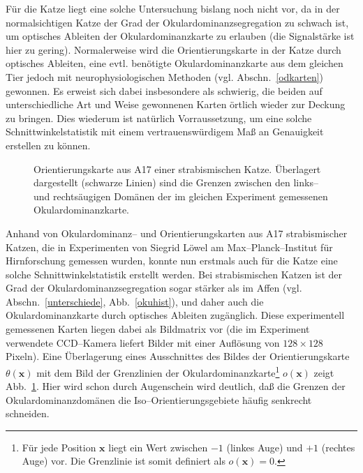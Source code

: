 Für die Katze liegt eine solche Untersuchung bislang noch nicht vor, da in
der normalsichtigen Katze der Grad der Okulardominanzsegregation zu schwach
ist, um optisches Ableiten der Okulardominanzkarte zu erlauben (die
Signalstärke ist hier zu gering). Normalerweise wird die
Orientierungskarte in der Katze durch optisches Ableiten, eine
evtl. benötigte Okulardominanzkarte aus dem gleichen Tier jedoch mit
neurophysiologischen Methoden (vgl. Abschn.~\ref{odkarten}) gewonnen. Es
erweist sich dabei insbesondere als schwierig, die beiden auf
unterschiedliche Art und Weise gewonnenen Karten örtlich wieder zur
Deckung zu bringen. Dies wiederum ist natürlich Vorraussetzung, um eine
solche Schnittwinkelstatistik mit einem vertrauenswürdigem Maß an
Genauigkeit erstellen zu können.

\begin{figure}[t]
\begin{center}
\end{center}
\caption{Orientierungskarte aus A17 einer strabismischen Katze. Überlagert
dargestellt (schwarze Linien) sind die Grenzen zwischen den links-- und
rechtsäugigen Domänen der im gleichen Experiment gemessenen
Okulardominanzkarte.}
\label{odop_pict}
\end{figure}

Anhand von Okulardominanz-- und Orientierungskarten aus A17 strabismischer
Katzen, die in Experimenten von Siegrid Löwel am Max--Planck--Institut
für Hirnforschung gemessen wurden, konnte nun erstmals auch für die Katze
eine solche Schnittwinkelstatistik erstellt werden. Bei strabismischen
Katzen ist der Grad der Okulardominanzsegregation sogar stärker als im
Affen (vgl. Abschn.~\ref{unterschiede}, Abb.~\ref{okuhist}), und daher auch
die Okulardominanzkarte durch optisches Ableiten zugänglich. Diese
experimentell gemessenen Karten liegen dabei als Bildmatrix vor (die im
Experiment verwendete CCD--Kamera liefert Bilder mit einer Auflösung von
$128\times 128$ Pixeln). Eine Überlagerung eines Ausschnittes des Bildes
der Orientierungskarte $\theta(\mathbf{x})$ mit dem Bild der Grenzlinien
der Okulardominanzkarte\footnote{Für jede Position $\mathbf{x}$ liegt ein
Wert zwischen $-1$ (linkes Auge) und $+1$ (rechtes Auge) vor. Die
Grenzlinie ist somit definiert als $o(\mathbf{x}) = 0$.} $o(\mathbf{x})$
zeigt Abb.~\ref{odop_pict}. Hier wird schon durch Augenschein wird
deutlich, daß die Grenzen der Okulardominanzdomänen die
Iso--Orientierungsgebiete häufig senkrecht schneiden.
\setcounter{footnote}{1}

